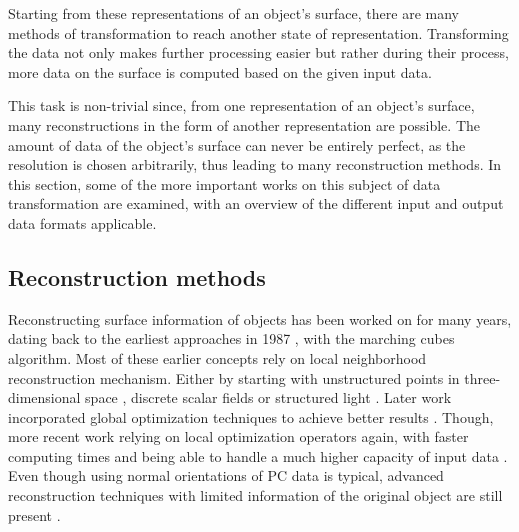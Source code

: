   Starting from these representations of an object's surface, there are many methods 
  of transformation to reach another state of representation. 
  Transforming the data not only makes further processing easier
  but rather during their process, more data on the surface is 
  computed based on the given input data.

  This task is non-trivial since, from one representation of an object's
  surface, many reconstructions in the form of another representation 
  are possible. The amount of data of the object's surface can never
  be entirely perfect, as the resolution is chosen arbitrarily, thus leading to many reconstruction methods.
  In this section, some of the more important works on this subject of data transformation are examined, with 
  an overview of the different input and output data formats applicable. 

 \subsection{Reconstruction methods}
 Reconstructing surface information of objects has been worked on for many years, 
 dating back to the earliest approaches in 1987 \cite{Lorensen:1987:MCH:37402.37422}, 
 with the marching cubes algorithm. Most of these earlier concepts rely on local neighborhood 
 reconstruction mechanism. Either by starting with unstructured points in three-dimensional 
 space \cite{817351,Amenta:2001:PC:376957.376986}, discrete scalar fields \cite{Lorensen:1987:MCH:37402.37422} or structured light \cite{Groh2017}. Later work incorporated global 
 optimization techniques to achieve better results \cite{Kazhdan:2006:PSR:1281957.1281965}. Though, more recent work relying on local optimization
  operators again, with faster computing times and being able to handle a much higher capacity of input data \cite{Jakob2015Instant}. 
 Even though using normal orientations of PC data is typical, advanced reconstruction techniques with limited
  information of the original object are still present \cite{bukenberger2018hierarchical}.
 
